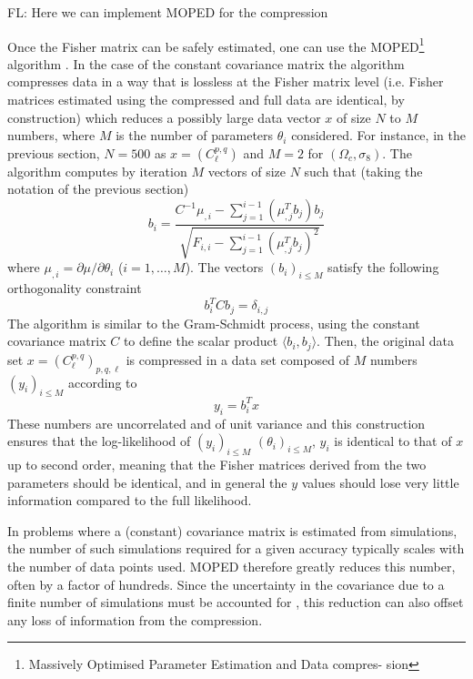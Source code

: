 \documentclass[twocolumn,twocolappendix,nofootinbib,iop]{openjournal}
\newcommand{\FrL}[1]{{\color{cyan}FL: #1}}
\begin{document}
\FrL{Here we can implement MOPED for the compression}

Once the Fisher matrix can be safely estimated, one can use the MOPED\footnote{Massively Optimised Parameter Estimation and Data compres-
sion} algorithm \citep{2000MNRAS.317..965H,2016PhRvD..93h3525Z, 2017MNRAS.472.4244H}. In the case of the constant covariance matrix the algorithm compresses data in a way that is lossless at the Fisher matrix level (i.e. Fisher matrices estimated using the compressed and full data are identical, by construction)  which reduces a possibly large data vector $x$ of size $N$ to $M$ numbers, where $M$ is the number of parameters $\theta_i$ considered. For instance, in the previous section, $N=500$ as $x=(C_\ell^{p,q})$ and $M=2$ for $(\Omega_c,\sigma_8)$. The algorithm computes by iteration $M$ vectors of size $N$ such that (taking the notation of the previous section)
\begin{equation}
    b_i = \frac{C^{-1}\mu_{,i}-\sum_{j=1}^{i-1}(\mu_{,j}^T b_j)b_j}{\sqrt{F_{i,i}-\sum_{j=1}^{i-1}(\mu_{,j}^T b_j)^2}}
\end{equation}
where $\mu_{,i}=\partial \mu/\partial \theta_i$ ($i=1,\dots,M$). The vectors $(b_i)_{i\leq M}$ satisfy the following orthogonality constraint
\begin{equation}
    b_i^T C b_j = \delta_{i,j}
\end{equation}
The algorithm is similar to the Gram-Schmidt process, using the constant covariance matrix $C$ to define the scalar product $\langle b_i, b_j\rangle$. Then, the original data set $x=(C_\ell^{p,q})_{p,q,\ell}$ is compressed in a data set composed of $M$ numbers $(y_i)_{i\leq M}$ according to
\begin{equation}
    y_i = b_i^T x
\end{equation}
These numbers are uncorrelated and of unit variance and this construction ensures that the log-likelihood of $(y_i)_{i\leq M}$  $(\theta_i)_{i\leq M}$, $y_i$ is identical to that of $x$ up to second order, meaning that the Fisher matrices derived from the two parameters should be identical, and in general the $y$ values should lose very little information compared to the full likelihood.

In problems where a (constant) covariance matrix is estimated from simulations, the number of such simulations required for a given accuracy typically scales with the number of data points used. 
MOPED therefore greatly reduces this number, often by a factor of hundreds. Since the uncertainty in the covariance due to a finite number of simulations must be accounted for \citep{2018MNRAS.473.2355S,2007A&A...464..399H}, this reduction can also offset any loss of information from the compression.
\end{document}
